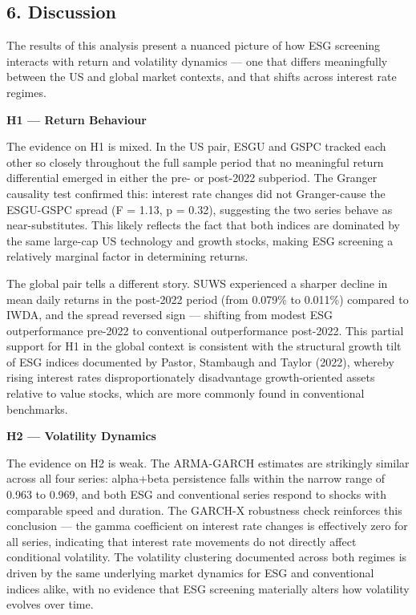 \documentclass[
]{article}
\begin{document}
\subsection{6. Discussion}\label{discussion}

The results of this analysis present a nuanced picture of how ESG
screening interacts with return and volatility dynamics --- one that
differs meaningfully between the US and global market contexts, and that
shifts across interest rate regimes.

\textbf{H1 --- Return Behaviour}

The evidence on H1 is mixed. In the US pair, ESGU and GSPC tracked each
other so closely throughout the full sample period that no meaningful
return differential emerged in either the pre- or post-2022 subperiod.
The Granger causality test confirmed this: interest rate changes did not
Granger-cause the ESGU-GSPC spread (F = 1.13, p = 0.32), suggesting the
two series behave as near-substitutes. This likely reflects the fact
that both indices are dominated by the same large-cap US technology and
growth stocks, making ESG screening a relatively marginal factor in
determining returns.

The global pair tells a different story. SUWS experienced a sharper
decline in mean daily returns in the post-2022 period (from 0.079\% to
0.011\%) compared to IWDA, and the spread reversed sign --- shifting
from modest ESG outperformance pre-2022 to conventional outperformance
post-2022. This partial support for H1 in the global context is
consistent with the structural growth tilt of ESG indices documented by
Pastor, Stambaugh and Taylor (2022), whereby rising interest rates
disproportionately disadvantage growth-oriented assets relative to value
stocks, which are more commonly found in conventional benchmarks.

\textbf{H2 --- Volatility Dynamics}

The evidence on H2 is weak. The ARMA-GARCH estimates are strikingly
similar across all four series: alpha+beta persistence falls within the
narrow range of 0.963 to 0.969, and both ESG and conventional series
respond to shocks with comparable speed and duration. The GARCH-X
robustness check reinforces this conclusion --- the gamma coefficient on
interest rate changes is effectively zero for all series, indicating
that interest rate movements do not directly affect conditional
volatility. The volatility clustering documented across both regimes is
driven by the same underlying market dynamics for ESG and conventional
indices alike, with no evidence that ESG screening materially alters how
volatility evolves over time.
\end{document}
